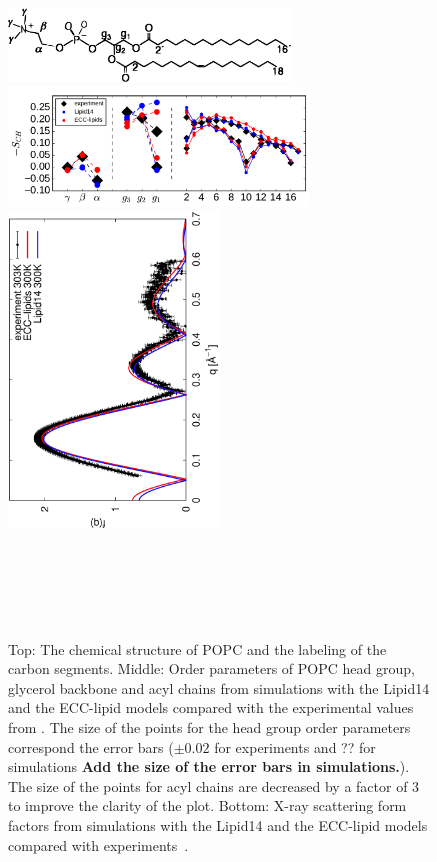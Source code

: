 \documentclass[aip,jcp,twocolumn]{revtex4}
\begin{document}
\begin{figure}[tbp]
  \centering
  \includegraphics[width=7.5cm]{../Fig/POPCstructure.eps}
  \includegraphics[width=8.0cm]{../Fig/ipython_nb/Order-parameters_exp-L14-ECCL17_q80_sig89.pdf}
  \includegraphics[height=8.4cm,angle=-90]{../Fig/form-f_exp-l14-eccl17.eps}
  \caption{\label{simVSexpNOions}
    Top: The chemical structure of POPC and the labeling of the carbon segments.
    Middle: Order parameters of POPC head group, glycerol backbone and acyl chains 
    from simulations with the Lipid14 \cite{dickson14} and the ECC-lipid models
    compared with the experimental values from \cite{ferreira13}.
    The size of the points for the head group order parameters correspond 
    the error bars ($\pm 0.02$ for experiments \cite{botan15,ollila16} and ?? for
    simulations {\bf Add the size of the error bars in simulations.}).
    The size of the points for acyl chains are decreased by a factor of 3 to improve the clarity of the plot.
    Bottom: X-ray scattering form factors from simulations with the Lipid14 \cite{dickson14} and
    the ECC-lipid models compared with experiments~\cite{Kucerka2011}.
  } 
   \\
   \\
   \\
   \\
\end{figure}
\end{document}
